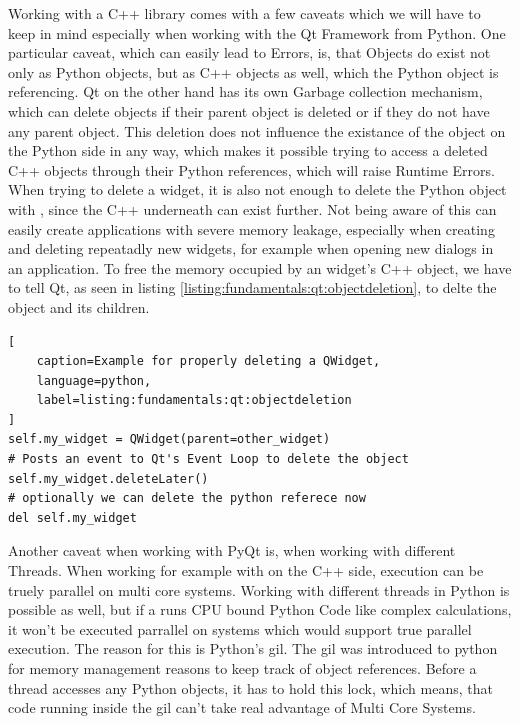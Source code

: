 Working with a C++ library comes with a few caveats which we will have to keep in mind especially when working with the Qt Framework from Python. One particular caveat, which can easily lead to Errors, is, that Objects do exist not only as Python objects, but as C++ objects as well, which the Python object is referencing. Qt on the other hand has its own Garbage collection mechanism, which can delete objects if their parent object is deleted or if they do not have any parent object. This deletion does not influence the existance of the object on the Python side in any way, which makes it possible trying to access a deleted C++ objects through their Python references, which will raise Runtime Errors. When trying to delete a widget, it is also not enough to delete the Python object with , since the C++ underneath can exist further. Not being aware of this can easily create applications with severe memory leakage, especially when creating and deleting repeatadly new widgets, for example when opening new dialogs in an application. To free the memory occupied by an widget's C++ object, we have to tell Qt, as seen in listing \ref{listing:fundamentals:qt:objectdeletion}, to delte the object and its children.

\begin{lstlisting}[
    caption=Example for properly deleting a QWidget,
    language=python, 
    label=listing:fundamentals:qt:objectdeletion
]
self.my_widget = QWidget(parent=other_widget)
# Posts an event to Qt's Event Loop to delete the object
self.my_widget.deleteLater()
# optionally we can delete the python referece now
del self.my_widget
\end{lstlisting}

Another caveat when working with PyQt is, when working with different Threads. When working for example with  on the C++ side, execution can be truely parallel on multi core systems. Working with different threads in Python is possible as well, but if a  runs CPU bound Python Code like complex calculations, it won't be executed parrallel on systems which would support true parallel execution. The reason for this is Python's \gls{gil}. The \gls{gil} was introduced to python for memory management reasons to keep track of object references. Before a thread accesses any Python objects, it has to hold this lock, which means, that code running inside the \gls{gil} can't take real advantage of Multi Core Systems.
\cite{PythonGil, PythonGilDocs}

